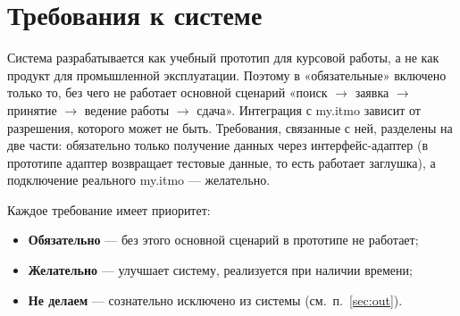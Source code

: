 \documentclass[a4paper,12pt]{article}
\begin{document}
\section{Требования к системе}

Система разрабатывается как учебный прототип для курсовой работы, а не как продукт для промышленной эксплуатации. Поэтому в «обязательные» включено только то, без чего не работает основной сценарий «поиск $\rightarrow$ заявка $\rightarrow$ принятие $\rightarrow$ ведение работы $\rightarrow$ сдача». Интеграция с my.itmo зависит от разрешения, которого может не быть. Требования, связанные с ней, разделены на две части: обязательно только получение данных через интерфейс-адаптер (в прототипе адаптер возвращает тестовые данные, то есть работает заглушка), а подключение реального my.itmo — желательно.

Каждое требование имеет приоритет:
\begin{itemize}
  \item \textbf{Обязательно} — без этого основной сценарий в прототипе не работает;
  \item \textbf{Желательно} — улучшает систему, реализуется при наличии времени;
  \item \textbf{Не делаем} — сознательно исключено из системы (см.\ п.~\ref{sec:out}).
\end{itemize}
\end{document}
